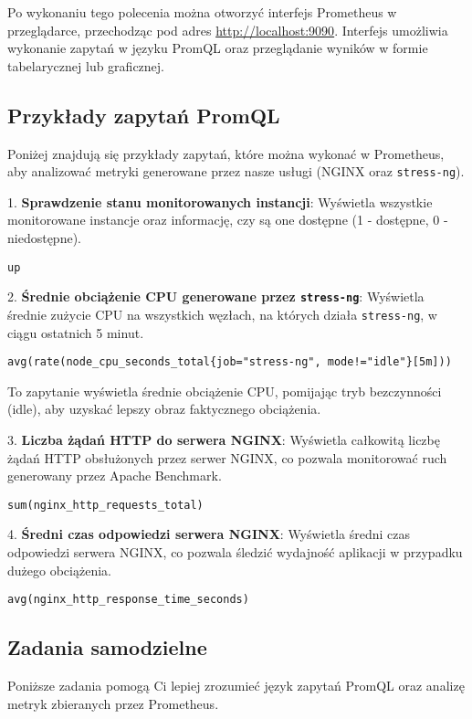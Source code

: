 \documentclass{article}
\begin{document}
Po wykonaniu tego polecenia można otworzyć interfejs Prometheus w przeglądarce, przechodząc pod adres \url{http://localhost:9090}. Interfejs umożliwia wykonanie zapytań w języku PromQL oraz przeglądanie wyników w formie tabelarycznej lub graficznej.

\subsection{Przykłady zapytań PromQL}

Poniżej znajdują się przykłady zapytań, które można wykonać w Prometheus, aby analizować metryki generowane przez nasze usługi (NGINX oraz \texttt{stress-ng}).

1. \textbf{Sprawdzenie stanu monitorowanych instancji}: Wyświetla wszystkie monitorowane instancje oraz informację, czy są one dostępne (1 - dostępne, 0 - niedostępne).
\begin{lstlisting}
up
\end{lstlisting}

2. \textbf{Średnie obciążenie CPU generowane przez \texttt{stress-ng}}: Wyświetla średnie zużycie CPU na wszystkich węzłach, na których działa \texttt{stress-ng}, w ciągu ostatnich 5 minut.
\begin{lstlisting}
avg(rate(node_cpu_seconds_total{job="stress-ng", mode!="idle"}[5m]))
\end{lstlisting}
To zapytanie wyświetla średnie obciążenie CPU, pomijając tryb bezczynności (idle), aby uzyskać lepszy obraz faktycznego obciążenia.

3. \textbf{Liczba żądań HTTP do serwera NGINX}: Wyświetla całkowitą liczbę żądań HTTP obsłużonych przez serwer NGINX, co pozwala monitorować ruch generowany przez Apache Benchmark.
\begin{lstlisting}
sum(nginx_http_requests_total)
\end{lstlisting}

4. \textbf{Średni czas odpowiedzi serwera NGINX}: Wyświetla średni czas odpowiedzi serwera NGINX, co pozwala śledzić wydajność aplikacji w przypadku dużego obciążenia.
\begin{lstlisting}
avg(nginx_http_response_time_seconds)
\end{lstlisting}


\subsection{Zadania samodzielne}

Poniższe zadania pomogą Ci lepiej zrozumieć język zapytań PromQL oraz analizę metryk zbieranych przez Prometheus.
\end{document}
